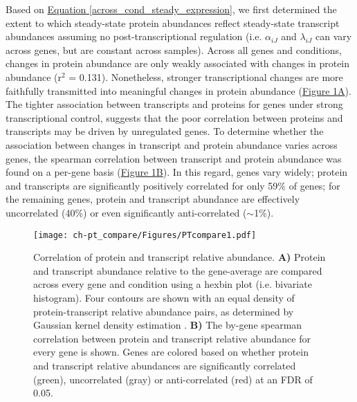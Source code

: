 Based on \hyperref[across_cond_steady_expression]{Equation \ref{across_cond_steady_expression}}, we first determined the extent to which steady-state protein abundances reflect steady-state transcript abundances assuming no post-transcriptional regulation (i.e. $\alpha_{iJ}$ and $\lambda_{iJ}$ can vary across genes, but are constant across samples).  Across all genes and conditions, changes in protein abundance are only weakly associated with changes in protein abundance (r$^{2}$ = 0.131). Nonetheless, stronger transcriptional changes are more faithfully transmitted into meaningful changes in protein abundance (\hyperref[ptscatter]{Figure \ref{ptscatter}A}).  The tighter association between transcripts and proteins for genes under strong transcriptional control, suggests that the poor correlation between proteins and transcripts may be driven by unregulated genes. To determine whether the association between changes in transcript and protein abundance varies across genes, the spearman correlation between transcript and protein abundance was found on a per-gene basis (\hyperref[ptscatter]{Figure \ref{ptscatter}B}). In this regard, genes vary widely; protein and transcripts are significantly positively correlated for only 59\% of genes; for the remaining genes, protein and transcript abundance are effectively uncorrelated (40\%) or even significantly anti-correlated ($\sim$1\%).

\begin{figure}[h!]
\begin{center}
\texttt{[image: ch-pt\_compare/Figures/PTcompare1.pdf]}
\caption[Correlation of protein and transcript relative abundance]{Correlation of protein and transcript relative abundance.  \textbf{A)} Protein and transcript abundance relative to the gene-average are compared across every gene and condition using a hexbin plot (i.e. bivariate histogram).  Four contours are shown with an equal density of protein-transcript relative abundance pairs, as determined by Gaussian kernel density estimation \cite{Anonymous:nXZxIOcv}.  \textbf{B)} The by-gene spearman correlation between protein and transcript relative abundance for every gene is shown.  Genes are colored based on whether protein and transcript relative abundances are significantly correlated (green), uncorrelated (gray) or anti-correlated (red) at an FDR of 0.05.}
\label{ptscatter}
\end{center}
\end{figure}

